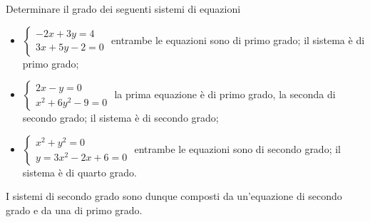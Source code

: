 \begin{esempio}
Determinare il grado dei seguenti sistemi di equazioni

\begin{itemize}
\item $\left\{\begin{array}{l}-2x+3y=4 \\3x+5y-2=0\end{array}\right.$ entrambe 
le equazioni sono di primo grado; il sistema è di primo grado;
\item $\left\{\begin{array}{l}2x-y=0 \\x^2+6y^2-9=0\end{array}\right.$ la prima 
equazione è di primo grado, la seconda di secondo grado; il sistema è di 
secondo 
grado;
\item $\left\{\begin{array}{l}x^2+y^2=0 \\y=3x^2-2x+6=0\end{array}\right.$ 
entrambe le equazioni sono di secondo grado; il sistema è di quarto grado.
\end{itemize}
\end{esempio}
I sistemi di secondo grado sono dunque composti da un'equazione di secondo 
grado 
e da una di primo grado.

